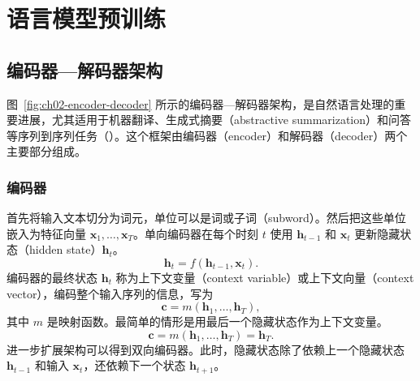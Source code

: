 \chapter{语言模型预训练}
\label{ch:pretraining}

\section{编码器—解码器架构}
图~\ref{fig:ch02-encoder-decoder} 所示的编码器—解码器架构，是自然语言处理的重要进展，尤其适用于机器翻译、生成式摘要（abstractive summarization）和问答等序列到序列任务（）。这个框架由编码器（encoder）和解码器（decoder）两个主要部分组成。

\subsection{编码器}
首先将输入文本切分为词元，单位可以是词或子词（subword）。然后把这些单位嵌入为特征向量 $\symbf{x}_1,\ldots,\symbf{x}_T$。单向编码器在每个时刻 $t$ 使用 $\symbf{h}_{t-1}$ 和 $\symbf{x}_t$ 更新隐藏状态（hidden state）$\symbf{h}_t$。
\begin{equation}
\symbf{h}_t=f(\symbf{h}_{t-1},\symbf{x}_t).
\tag{2.1}
\end{equation}
编码器的最终状态 $\symbf{h}_t$ 称为上下文变量（context variable）或上下文向量（context vector），编码整个输入序列的信息，写为
\begin{equation}
\symbf{c}=m(\symbf{h}_1,\ldots,\symbf{h}_T),
\tag{2.2}
\end{equation}
其中 $m$ 是映射函数。最简单的情形是用最后一个隐藏状态作为上下文变量。
\begin{equation}
\symbf{c}=m(\symbf{h}_1,\ldots,\symbf{h}_T)=\symbf{h}_T.
\tag{2.3}
\end{equation}
进一步扩展架构可以得到双向编码器。此时，隐藏状态除了依赖上一个隐藏状态 $\symbf{h}_{t-1}$ 和输入 $\symbf{x}_t$，还依赖下一个状态 $\symbf{h}_{t+1}$。

